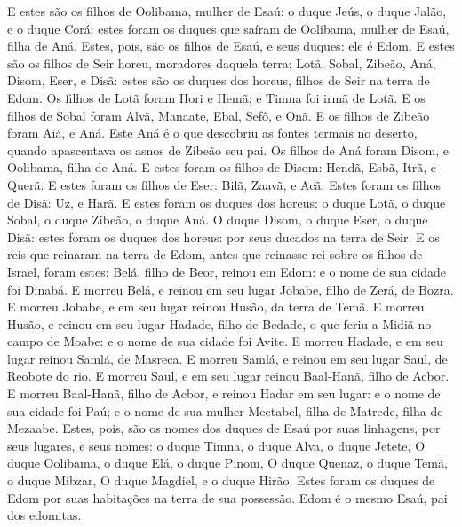 {{E estes são os filhos de Oolibama, mulher de Esaú: o duque Jeús, o duque Jalão, e o duque Corá: estes foram os duques que saíram de Oolibama, mulher de Esaú, filha de Aná.
Estes, pois, são os filhos de Esaú, e seus duques: ele é Edom.
E estes são os filhos de Seir horeu, moradores daquela terra: Lotã, Sobal, Zibeão, Aná,
Disom, Eser, e Disã: estes são os duques dos horeus, filhos de Seir na terra de Edom.
Os filhos de Lotã foram Hori e Hemã; e Timna foi irmã de Lotã.
E os filhos de Sobal foram Alvã, Manaate, Ebal, Sefô, e Onã.
E os filhos de Zibeão foram Aiá, e Aná. Este Aná é o que descobriu as fontes termais no deserto, quando apascentava os asnos de Zibeão seu pai.
Os filhos de Aná foram Disom, e Oolibama, filha de Aná.
E estes foram os filhos de Disom: Hendã, Esbã, Itrã, e Querã.
E estes foram os filhos de Eser: Bilã, Zaavã, e Acã.
Estes foram os filhos de Disã: Uz, e Harã.
E estes foram os duques dos horeus: o duque Lotã, o duque Sobal, o duque Zibeão, o duque Aná.
O duque Disom, o duque Eser, o duque Disã: estes foram os duques dos horeus: por seus ducados na terra de Seir.
E os reis que reinaram na terra de Edom, antes que reinasse rei sobre os filhos de Israel, foram estes:
Belá, filho de Beor, reinou em Edom: e o nome de sua cidade foi Dinabá.
E morreu Belá, e reinou em seu lugar Jobabe, filho de Zerá, de Bozra.
E morreu Jobabe, e em seu lugar reinou Husão, da terra de Temã.
E morreu Husão, e reinou em seu lugar Hadade, filho de Bedade, o que feriu a Midiã no campo de Moabe: e o nome de sua cidade foi Avite.
E morreu Hadade, e em seu lugar reinou Samlá, de Masreca.
E morreu Samlá, e reinou em seu lugar Saul, de Reobote do rio.
E morreu Saul, e em seu lugar reinou Baal-Hanã, filho de Acbor.
E morreu Baal-Hanã, filho de Acbor, e reinou Hadar em seu lugar: e o nome de sua cidade foi Paú; e o nome de sua mulher Meetabel, filha de Matrede, filha de Mezaabe.
Estes, pois, são os nomes dos duques de Esaú por suas linhagens, por seus lugares, e seus nomes: o duque Timna, o duque Alva, o duque Jetete,
O duque Oolibama, o duque Elá, o duque Pinom,
O duque Quenaz, o duque Temã, o duque Mibzar,
O duque Magdiel, e o duque Hirão. Estes foram os duques de Edom por suas habitações na terra de sua possessão. Edom é o mesmo Esaú, pai dos edomitas.

\par}

}
